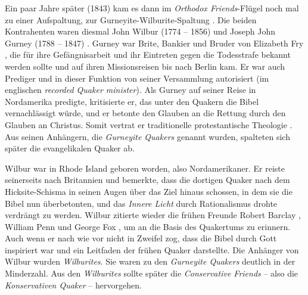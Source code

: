 Ein paar Jahre später (1843) kam es dann im \textit{Orthodox Friends}-Flügel
noch mal zu einer Aufspaltung, zur Gurneyite-Wilburite-Spaltung
. Die beiden
Kontrahenten waren diesmal John Wilbur (1774 -- 1856)  und Joseph John Gurney
(1788 -- 1847) . Gurney war Brite, Bankier
 und Bruder von Elizabeth Fry , die für
ihre Gefängnisarbeit  und ihr Eintreten gegen
die Todesstrafe  bekannt werden
sollte und auf ihren Missionsreisen bis nach Berlin kam.
Er war auch Prediger  und in dieser Funktion
von seiner
Versammlung autorisiert (im englischen \textit{recorded Quaker minister}). Als
Gurney auf seiner Reise in Nordamerika predigte, kritisierte er, das unter den
Quakern die Bibel  vernachlässigt würde, und er betonte den Glauben
an die
Rettung durch den Glauben an Christus. Somit vertrat er traditionelle
protestantische Theologie . Aus seinen
Anhängern, die \textit{Gurneyite Quakers}
genannt wurden, spalteten sich später die evangelikalen Quaker
 ab.

\medskip

Wilbur war in Rhode Island  geboren worden, also
Nordamerikaner. Er reiste seinerseits
nach Britannien und bemerkte, dass die dortigen Quaker nach dem Hicksite-Schisma
in seinen Augen über das Ziel hinaus schossen, in dem sie die Bibel nun
überbetonten, und das \textit{Innere Licht} durch Rationalismus drohte verdrängt
zu werden. Wilbur zitierte wieder die frühen Freunde Robert Barclay
, William
Penn  und George Fox , um an die Basis des Quakertums zu erinnern. Auch wenn er
nach wie vor nicht in Zweifel zog, dass die Bibel durch Gott inspiriert war und
ein Leitfaden der frühen Quaker darstellte. Die Anhänger von Wilbur wurden
\textit{Wilburites}. Sie waren zu den
\textit{Gurneyite Quakers} deutlich in der Minderzahl.
Aus den \textit{Wilburites} sollte später die
\textit{Conservative Friends}  -- also die
\textit{Konservativen Quaker} --
hervorgehen.

\medskip

